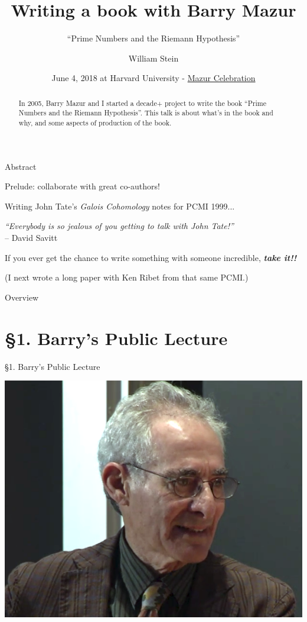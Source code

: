 \documentclass{beamer}
\title{Writing a book with Barry Mazur}
\subtitle{``Prime Numbers and the Riemann Hypothesis''}
\author[W.\thinspace{}Stein]{William Stein}
\date[Mazur 80]{June 4, 2018 at Harvard University - \href{http://www.math.harvard.edu/conferences/mazur18/}{Mazur Celebration}}
\institute[SageMath, Inc. \& UW]{SageMath, Inc. and University of Washington}
\newcommand{\mysection}[2]{\section{\S#1. #2}%
\begin{frame}{}
\vfill
\begin{center}
\hrulefill
\vfill
\Huge\sc \S#1. #2
\vfill
\hrulefill
\end{center}
\vfill
\end{frame}}
\begin{document}
\begin{frame}
  \titlepage
\end{frame}

\begin{frame}{Abstract}
  \begin{abstract}
    In 2005, Barry Mazur and I started a decade+ project to write the
    book ``Prime Numbers and the Riemann Hypothesis''.
    This talk is about
    what's in the book and why, and some aspects
    of production of the book.
  \end{abstract}
\end{frame}

\begin{frame}{Prelude: collaborate with great co-authors!}

  Writing John Tate's {\em Galois Cohomology} notes for PCMI 1999...

  \vfill

  \begin{block}{}
    {\em
      ``Everybody is so jealous of you getting
      to talk with John Tate!''}\\
    -- David Savitt
  \end{block}

  \vfill

  If you ever get the chance
  to write something with someone incredible,
  {\bf\em take it!!}

  \vfill

  (I next wrote a long paper with Ken Ribet from that same PCMI.)

\end{frame}


\begin{frame}{Overview}
  \tableofcontents
\end{frame}

\mysection{1}{Barry's Public Lecture}

\begin{frame}
\begin{center}
\includegraphics[height=.7\textheight]{pics/barry-msri}
\end{center}

\end{frame}
\end{document}
